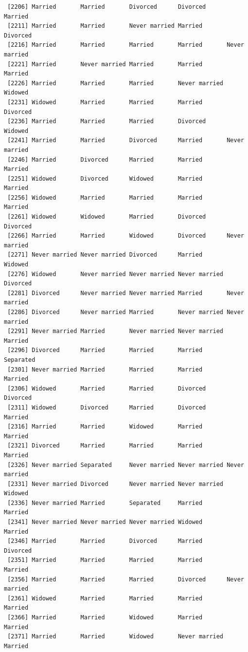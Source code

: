 \documentclass[
  letterpaper,
  DIV=11,
  numbers=noendperiod,
  oneside]{scrartcl}
\begin{document}
\begin{verbatim}
 [2206] Married       Married       Divorced      Divorced      Married      
 [2211] Married       Married       Never married Married       Divorced     
 [2216] Married       Married       Married       Married       Never married
 [2221] Married       Never married Married       Married       Married      
 [2226] Married       Married       Married       Never married Widowed      
 [2231] Widowed       Married       Married       Married       Divorced     
 [2236] Married       Married       Married       Divorced      Widowed      
 [2241] Married       Married       Divorced      Married       Never married
 [2246] Married       Divorced      Married       Married       Married      
 [2251] Widowed       Divorced      Widowed       Married       Married      
 [2256] Widowed       Married       Married       Married       Married      
 [2261] Widowed       Widowed       Married       Divorced      Divorced     
 [2266] Married       Married       Widowed       Divorced      Never married
 [2271] Never married Never married Divorced      Married       Widowed      
 [2276] Widowed       Never married Never married Never married Divorced     
 [2281] Divorced      Never married Never married Married       Never married
 [2286] Divorced      Never married Married       Never married Never married
 [2291] Never married Married       Never married Never married Married      
 [2296] Divorced      Married       Married       Married       Separated    
 [2301] Never married Married       Married       Married       Married      
 [2306] Widowed       Married       Married       Divorced      Divorced     
 [2311] Widowed       Divorced      Married       Divorced      Married      
 [2316] Married       Married       Widowed       Married       Married      
 [2321] Divorced      Married       Married       Married       Married      
 [2326] Never married Separated     Never married Never married Never married
 [2331] Never married Divorced      Never married Never married Widowed      
 [2336] Never married Married       Separated     Married       Married      
 [2341] Never married Never married Never married Widowed       Married      
 [2346] Married       Married       Divorced      Married       Divorced     
 [2351] Married       Married       Married       Married       Married      
 [2356] Married       Married       Married       Divorced      Never married
 [2361] Widowed       Married       Married       Married       Married      
 [2366] Married       Married       Widowed       Married       Married      
 [2371] Married       Married       Widowed       Never married Married      

\end{verbatim}
\end{document}
